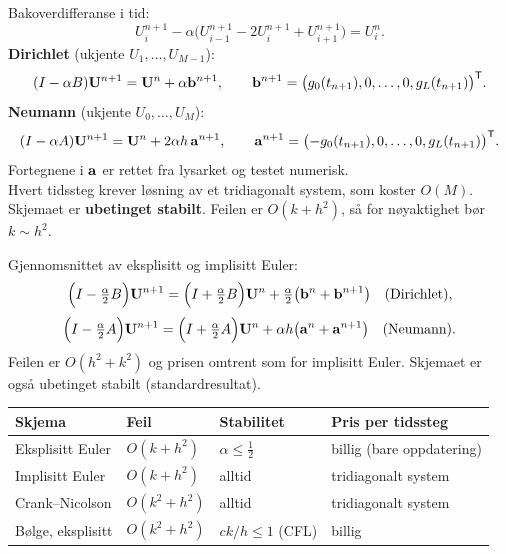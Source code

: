 \begin{formel}
Bakoverdifferanse i tid:
\[
U_i^{n+1}-\alpha\bigl(U_{i-1}^{n+1}-2U_i^{n+1}+U_{i+1}^{n+1}\bigr)=U_i^n .
\]
\textbf{Dirichlet} (ukjente $U_1,\dots,U_{M-1}$):
\[
(I-\alpha B)\mathbf{U}^{n+1}=\mathbf{U}^n+\alpha\mathbf{b}^{n+1},\qquad \mathbf{b}^{n+1}=\bigl(g_0(t_{n+1}),0,\dots,0,g_L(t_{n+1})\bigr)^{\mathsf{T}}.
\]
\textbf{Neumann} (ukjente $U_0,\dots,U_M$):
\[
(I-\alpha A)\mathbf{U}^{n+1}=\mathbf{U}^n+2\alpha h\,\mathbf{a}^{n+1},\qquad \mathbf{a}^{n+1}=\bigl(-g_0(t_{n+1}),0,\dots,0,g_L(t_{n+1})\bigr)^{\mathsf{T}}.
\]
Fortegnene i $\mathbf{a}$ er rettet fra lysarket og testet numerisk.\\
Hvert tidssteg krever løsning av et tridiagonalt system, som koster $O(M)$. Skjemaet er \textbf{ubetinget stabilt}. Feilen er $O(k+h^2)$, så for nøyaktighet bør $k\sim h^2$.
\end{formel}

\begin{formel}
Gjennomsnittet av eksplisitt og implisitt Euler:
\[
\Bigl(I-\tfrac\alpha2B\Bigr)\mathbf{U}^{n+1}=\Bigl(I+\tfrac\alpha2B\Bigr)\mathbf{U}^n+\tfrac\alpha2\bigl(\mathbf{b}^n+\mathbf{b}^{n+1}\bigr)\quad\text{(Dirichlet)},
\]
\[
\Bigl(I-\tfrac\alpha2A\Bigr)\mathbf{U}^{n+1}=\Bigl(I+\tfrac\alpha2A\Bigr)\mathbf{U}^n+\alpha h\bigl(\mathbf{a}^n+\mathbf{a}^{n+1}\bigr)\quad\text{(Neumann)}.
\]
Feilen er $O(h^2+k^2)$ og prisen omtrent som for implisitt Euler. Skjemaet er også ubetinget stabilt (standardresultat).
\end{formel}
\begin{center}
\small
\begin{tabular}{@{}llll@{}}
\toprule
Skjema & Feil & Stabilitet & Pris per tidssteg\\
\midrule
Eksplisitt Euler & $O(k+h^2)$ & $\alpha\le\frac12$ & billig (bare oppdatering)\\
Implisitt Euler & $O(k+h^2)$ & alltid & tridiagonalt system\\
Crank--Nicolson & $O(k^2+h^2)$ & alltid & tridiagonalt system\\
Bølge, eksplisitt & $O(k^2+h^2)$ & $ck/h\le1$ (CFL) & billig\\
\bottomrule
\end{tabular}
\end{center}



